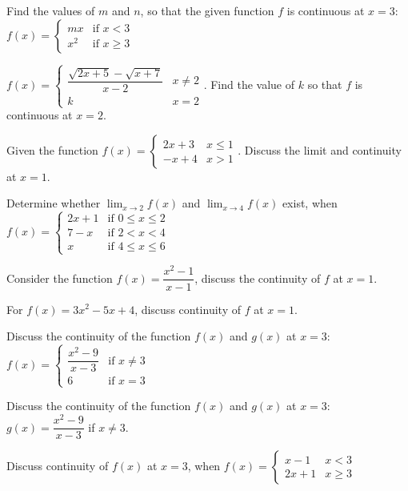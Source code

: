 \documentclass[11pt,a4paper]{article}
\begin{document}
\begin{longlist}
\item Find the values of $m$ and $n$, so that the given function $f$ is continuous at $x=3$: $f(x) = \begin{cases} mx & \text{if } x<3 \\ x^2 & \text{if } x\geq 3 \end{cases}$

\item $f(x)=\begin{cases} \dfrac{\sqrt{2x+5}-\sqrt{x+7}}{x-2} & x\neq 2 \\ k & x=2 \end{cases}$. Find the value of $k$ so that $f$ is continuous at $x=2$.

\item Given the function $f(x) = \begin{cases} 2x+3 & x\leq 1 \\ -x+4 & x>1 \end{cases}$. Discuss the limit and continuity at $x=1$.

\item Determine whether $\displaystyle\lim_{x\to2} f(x)$ and $\displaystyle\lim_{x\to4} f(x)$ exist, when $f(x) = \begin{cases} 2x+1 & \text{if } 0\leq x\leq 2 \\ 7-x & \text{if } 2<x<4 \\ x & \text{if } 4\leq x\leq 6 \end{cases}$

\item Consider the function $f(x) = \dfrac{x^2-1}{x-1}$, discuss the continuity of $f$ at $x=1$.

\item For $f(x)=3x^2-5x+4$, discuss continuity of $f$ at $x=1$.

\item Discuss the continuity of the function $f(x)$ and $g(x)$ at $x=3$: $f(x) = \begin{cases} \dfrac{x^2-9}{x-3} & \text{if } x\neq 3 \\ 6 & \text{if } x=3 \end{cases}$

\item Discuss the continuity of the function $f(x)$ and $g(x)$ at $x=3$: $g(x) = \dfrac{x^2-9}{x-3}$ if $x\neq 3$.

\item Discuss continuity of $f(x)$ at $x=3$, when $f(x) = \begin{cases} x-1 & x<3 \\ 2x+1 & x\geq 3 \end{cases}$


\end{longlist}
\end{document}
